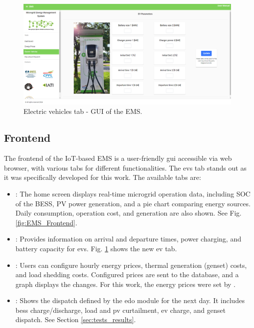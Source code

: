\documentclass[preprint, 12pt, 3p]{elsarticle}
\begin{document}
\begin{figure}
    \centering
    \includegraphics[width=\textwidth]{Figures/EMS/EVs.png}
    \caption{Electric vehicles tab - GUI of the EMS.}
    \label{fig:EMS_Frontend_ev}
\end{figure}

\subsection{Frontend}

The frontend of the IoT-based EMS is a user-friendly \gls{gui} accessible via
web browser, with various tabs for different functionalities.
The \glspl{ev} tab stands out as it was specifically 
developed for this work. The available tabs are:

\begin{itemize}
    \item {}: The home screen displays real-time microgrid 
    operation data, including SOC of the BESS, PV power generation, and a pie 
    chart comparing energy sources. Daily consumption, operation cost, and 
    generation are also shown. See Fig. \ref{fig:EMS_Frontend}.
    \item {}: Provides information on 
    arrival and departure times, power charging, and battery capacity for 
    \glspl{ev}. Fig. \ref{fig:EMS_Frontend_ev} shows the new \gls{ev} tab.
    \item {}: Users can configure hourly energy prices, 
    thermal generation (genset) costs, and load shedding costs. 
    Configured prices are sent to the database, and a graph displays the 
    changes. For this work, the energy prices were set by \cite{aneel}.
    \item {}: Shows the dispatch defined by the \gls{edo}
    module for the next day. It includes \gls{bess} charge/discharge, load and \gls{pv} curtailment, \gls{ev} charge, and \gls{genset} dispatch. See Section \ref{sec:tests_results}.
\end{itemize}
\end{document}
